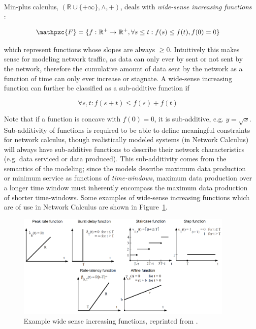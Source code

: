Min-plus calculus, $(\mathbb{R}\cup\{+\infty\},\wedge,+)$, deals with
\textit{wide-sense increasing functions} :

\begin{equation}
  \mathpzc{F}=\{f : \mathbb{R}^+ \rightarrow \mathbb{R}^+, \forall s
  \leq t : f(s) \leq f(t), f(0) = 0\}
\end{equation}

which represent functions whose slopes are always $\geq 0$.
Intuitively this makes sense for modeling network traffic, as data can
only ever by sent or not sent by the network, therefore the cumulative
amount of data sent by the network as a function of time can only ever
increase or stagnate.  A wide-sense increasing function can further be
classified as a sub-additive function if

\begin{equation}
  \forall s,t : f(s+t) \leq f(s) + f(t)
\end{equation}

Note that if a function is concave with $f(0)=0$, it is sub-additive,
e.g. $y=\sqrt{x}$.  Sub-additivity of functions is required to be able
to define meaningful constraints for network calculus, though
realistically modeled systems (in Network Calculus) will always have
sub-additive functions to describe their network characteristics
(e.g. data serviced or data produced).  This sub-additivity comes from
the semantics of the modeling; since the models describe maximum data
production or minimum service as functions of \emph{time-windows},
maximum data production over a longer time window must inherently
encompass the maximum data production of shorter time-windows.  Some
examples of wide-sense increasing functions which are of use in
Network Calculus are shown in Figure~\ref{fig:wsi}.

\begin{figure}[htb]
  \centering
  \includegraphics[width=0.95\textwidth]{figs/wsi.png}
  \caption{Example wide sense increasing functions, reprinted from \cite{NCBook}.}
  \label{fig:wsi}
\end{figure}

